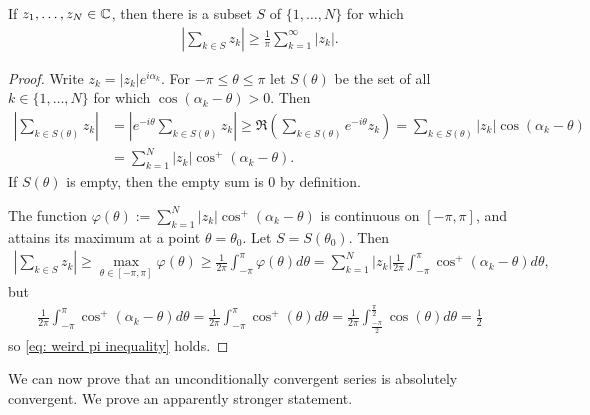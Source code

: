 \begin{lemma} \label{lem: weird pi inequality}
If $z_{1}, \dots, z_{N} \in \mathbb{C}$, then there is a subset $S$ of $\{1, \dots, N\}$ for which
\begin{align}
	\left| \sum_{k\in S} z_{k} \right| \ge \frac{1}{\pi} \sum_{k=1}^{\infty} |z_{k}|. \label{eq: weird pi inequality}
\end{align}
\end{lemma}
\begin{proof}
Write $z_{k}=|z_{k}|e^{i\alpha_{k}}$. For $-\pi \le \theta \le \pi$ let $S(\theta)$ be the set of all $k\in \{1, \dots, N\}$ for which $\cos(\alpha_{k} - \theta) > 0$. Then
\begin{align*}
	\left| \sum_{k\in S(\theta)} z_{k} \right| &= \left| e^{-i\theta} \sum_{k\in S(\theta)} z_{k} \right| \ge \mathfrak{R} \left( \sum_{k\in S(\theta)} e^{-i\theta} z_{k} \right) = \sum_{k\in S(\theta)} |z_{k}|\cos(\alpha_{k} - \theta) \\
	&= \sum_{k=1}^{N} |z_{k}| \cos^{+}(\alpha_{k}- \theta).
\end{align*}
If $S(\theta)$ is empty, then the empty sum is 0 by definition.

The function $\varphi(\theta):=\sum_{k=1}^{N} |z_{k}| \cos^{+}(\alpha_{k}- \theta)$ is continuous on $[-\pi, \pi]$, and attains its maximum at a point $\theta=\theta_{0}$. Let $S=S(\theta_{0})$. Then
\begin{align*}
	\left| \sum_{k\in S} z_{k} \right| \ge \max_{\theta\in [-\pi, \pi]} \varphi(\theta) \ge \frac{1}{2\pi} \int_{-\pi}^{\pi} \varphi(\theta)d\theta = \sum_{k=1}^{N} |z_{k}| \frac{1}{2\pi} \int_{-\pi}^{\pi} \cos^{+}(\alpha_{k}-\theta)d\theta,
\end{align*}
but
\begin{align*}
	\frac{1}{2\pi}\int_{-\pi}^{\pi} \cos^{+}(\alpha_{k}-\theta)d\theta = \frac{1}{2\pi}\int_{-\pi}^{\pi} \cos^{+}(\theta)d\theta=\frac{1}{2\pi}\int_{\frac{-\pi}{2}}^{\frac{\pi}{2}} \cos(\theta)d\theta = \frac{1}{2}
\end{align*}
so \eqref{eq: weird pi inequality} holds.
\end{proof}

We can now prove that an unconditionally convergent series is absolutely convergent. We prove an apparently stronger statement.


